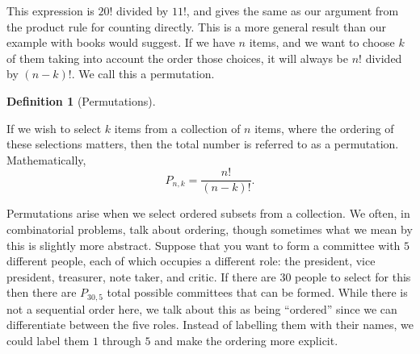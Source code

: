 \documentclass[
  letterpaper,
  DIV=11,
  numbers=noendperiod]{scrreprt}
\theoremstyle{definition}
\theoremstyle{definition}
\theoremstyle{definition}
\newtheorem{definition}{Definition}[chapter]
\theoremstyle{remark}
\begin{document}
This expression is \(20!\) divided by \(11!\), and gives the same as our
argument from the product rule for counting directly. This is a more
general result than our example with books would suggest. If we have
\(n\) items, and we want to choose \(k\) of them taking into account the
order those choices, it will always be \(n!\) divided by \((n-k)!\). We
call this a permutation.

\begin{definition}[Permutations]\protect\hypertarget{def-permutation}{}\label{def-permutation}

If we wish to select \(k\) items from a collection of \(n\) items, where
the ordering of these selections matters, then the total number is
referred to as a permutation. Mathematically,
\[P_{n,k} = \frac{n!}{(n-k)!}.\]

\end{definition}

Permutations arise when we select ordered subsets from a collection. We
often, in combinatorial problems, talk about ordering, though sometimes
what we mean by this is slightly more abstract. Suppose that you want to
form a committee with \(5\) different people, each of which occupies a
different role: the president, vice president, treasurer, note taker,
and critic. If there are \(30\) people to select for this then there are
\(P_{30,5}\) total possible committees that can be formed. While there
is not a sequential order here, we talk about this as being ``ordered''
since we can differentiate between the five roles. Instead of labelling
them with their names, we could label them \(1\) through \(5\) and make
the ordering more explicit.
\end{document}
